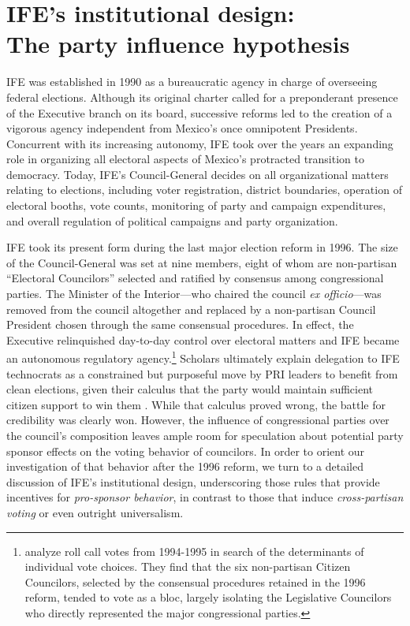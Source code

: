 \documentclass[12 pt, letter]{article}
\begin{document}
\singlespacing
\section{IFE's institutional design:\\  The party influence hypothesis}\label{S:description}

\doublespacing IFE was established in 1990 as a bureaucratic agency in charge of overseeing federal elections.  Although its original charter called for a preponderant presence of the Executive branch on its board, successive reforms led to the creation of a vigorous agency independent from Mexico's once omnipotent Presidents.  Concurrent with its increasing autonomy, IFE took over the years an expanding role in organizing all electoral aspects of Mexico's protracted transition to democracy.  Today, IFE's Council-General decides on all organizational matters relating to elections, including voter registration, district boundaries, operation of electoral booths, vote counts, monitoring of party and campaign expenditures, and overall regulation of political campaigns and party organization.

IFE took its present form during the last major election reform in 1996.  The size of the Council-General was set at nine members, eight of whom are non-partisan ``Electoral Councilors'' selected and ratified by consensus among congressional parties.  The Minister of the Interior---who chaired the council \emph{ex officio}---was removed from the council altogether and replaced by a non-partisan Council President chosen through the same consensual procedures.  In effect, the Executive relinquished day-to-day control over electoral matters and IFE became an autonomous regulatory agency.\footnote{\citet{Malo1996} analyze roll call votes from 1994-1995 in search of the determinants of individual vote choices.  They find that the six non-partisan Citizen Councilors, selected by the consensual procedures retained in the 1996 reform, tended to vote as a bloc, largely isolating the Legislative Councilors who directly represented the major congressional parties.} Scholars ultimately explain delegation to IFE technocrats as a constrained but purposeful move by PRI leaders to benefit from clean elections, given their calculus that the party would maintain sufficient citizen support to win them \citep{Magaloni2006}.  While that calculus proved wrong, the battle for credibility was clearly won. However, the influence of congressional parties over the council's composition leaves ample room for speculation about potential party sponsor effects on the voting behavior of councilors.  In order to orient our investigation of that behavior after the 1996 reform, we turn to a detailed discussion of IFE's institutional design, underscoring those rules that provide incentives for \emph{pro-sponsor behavior}, in contrast to those that induce \emph{cross-partisan voting} or even outright universalism.
\end{document}
